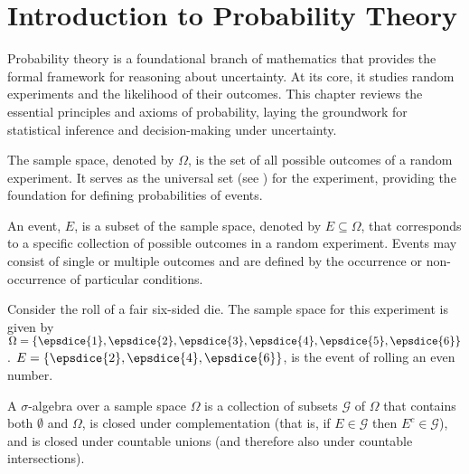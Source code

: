 \chapter{Introduction to Probability Theory}
\label{chp:probaiblity_theory}
Probability theory is a foundational branch of mathematics that provides the formal framework for reasoning about uncertainty. At its core, it studies random experiments and the likelihood of their outcomes. This chapter reviews the essential principles and axioms of probability, laying the groundwork for statistical inference and decision-making under uncertainty.

\begin{definition}
	\label{def:sample_space}
	The sample space, denoted by $\Omega$, is the set of all possible outcomes of a random experiment. It serves as the universal set (see ) for the experiment, providing the foundation for defining probabilities of events.
\end{definition}

\begin{definition}[Event]
	An event, $E$, is a subset of the sample space, denoted by $E \subseteq \Omega$, that corresponds to a specific collection of possible outcomes in a random experiment. Events may consist of single or multiple outcomes and are defined by the occurrence or non-occurrence of particular conditions.
\end{definition}

\begin{example}
	\label{ex:die1}
	Consider the roll of a fair six-sided die. The sample space for this experiment is given by $\Omega = \{ \epsdice{1}, \epsdice{2}, \epsdice{3}, \epsdice{4}, \epsdice{5}, \epsdice{6} \}$. $E = \{\epsdice{2}, \epsdice{4}, \epsdice{6}\}$, is the event of rolling an even number. 
\end{example}

\begin{definition}
	\label{def:sigma_algebra}
	A $\sigma$-algebra over a sample space $\Omega$ is a collection of subsets $\mathcal{G}$ of $\Omega$ that contains both $\emptyset$ and $\Omega$, is closed under complementation (that is, if $E \in \mathcal{G}$ then $E^c \in \mathcal{G}$), and is closed under countable unions (and therefore also under countable intersections).
\end{definition}

